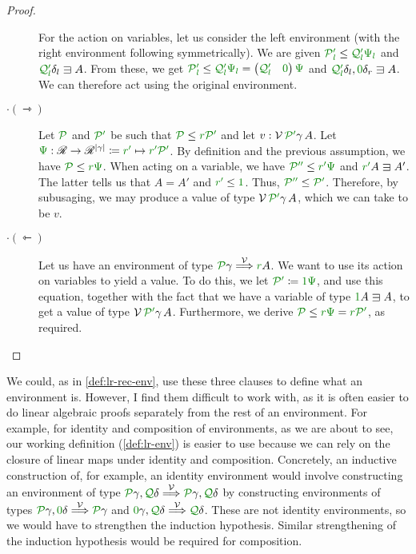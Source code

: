 \begin{proof}
\begin{description}
      For the action on variables, let us consider the left environment (with
      the right environment following symmetrically).
      We are given $\gr{\grP'_l} \leq \gr{\grQ'_l}\gr\Psi_{\gr l}$ and
      $\gr{\grQ'_l}\delta_l \sqni A$.
      From these, we get
      $\gr{\grP'_l} \leq \gr{\grQ'_l}\gr\Psi_{\gr l} =
      \begin{pmatrix} \gr{\grQ'_l} & \gr0 \end{pmatrix}\gr\Psi$ and
      $\gr{\grQ'_l}\delta_l, \gr0\delta_r \sqni A$.
      We can therefore act using the original environment.
    \item[$\cdot(\rightarrowtriangle)$]
      Let $\grP$ and $\grPprime$ be such that $\grP \leq \gr r\grPprime$ and let
      $v : \V\,\grPprime\gamma\,A$.
      Let $\gr\Psi : \Ann \to \Ann^{\size\gamma}
      \coloneqq \gr r\gr' \mapsto \gr r\gr'\grPprime$.
      By definition and the previous assumption, we have
      $\grP \leq \gr r\gr\Psi$.
      When acting on a variable, we have $\grP\gr{''} \leq \gr r\gr'\gr\Psi$
      and $\gr r\gr'A \sqni A'$.
      The latter tells us that $A = A'$ and $\gr r\gr' \leq \gr1$.
      Thus, $\grP\gr{''} \leq \grPprime$.
      Therefore, by subusaging, we may produce a value of type
      $\V\,\grPprime\gamma\,A$, which we can take to be $v$.
    \item[$\cdot(\leftarrowtriangle)$]
      Let us have an environment of type $\grP\gamma \env\V \gr rA$.
      We want to use its action on variables to yield a value.
      To do this, we let $\grPprime \coloneqq \gr1\gr\Psi$, and use this
      equation, together with the fact that we have a variable of type
      $\gr1A \sqni A$, to get a value of type $\V\,\grPprime\gamma\,A$.
      Furthermore, we derive $\grP \leq \gr r\gr\Psi = \gr r\grPprime$, as
      required.
  \end{description}
\end{proof}

We could, as in \cref{def:lr-rec-env}, use these three clauses to define what an
environment is.
However, I find them difficult to work with, as it is often easier to do
linear algebraic proofs separately from the rest of an environment.
For example, for identity and composition of environments, as we are about to
see, our working definition (\cref{def:lr-env})
is easier to use because we can rely on the closure of linear maps under
identity and composition.
Concretely, an inductive construction of, for example, an identity environment
would involve constructing an environment of type
$\grP\gamma, \grQ\delta \env\V \grP\gamma, \grQ\delta$ by constructing
environments of types $\grP\gamma, \gr0\delta \env\V \grP\gamma$ and
$\gr0\gamma, \grQ\delta \env\V \grQ\delta$.
These are not identity environments, so we would have to strengthen the
induction hypothesis.
Similar strengthening of the induction hypothesis would be required for
composition.

